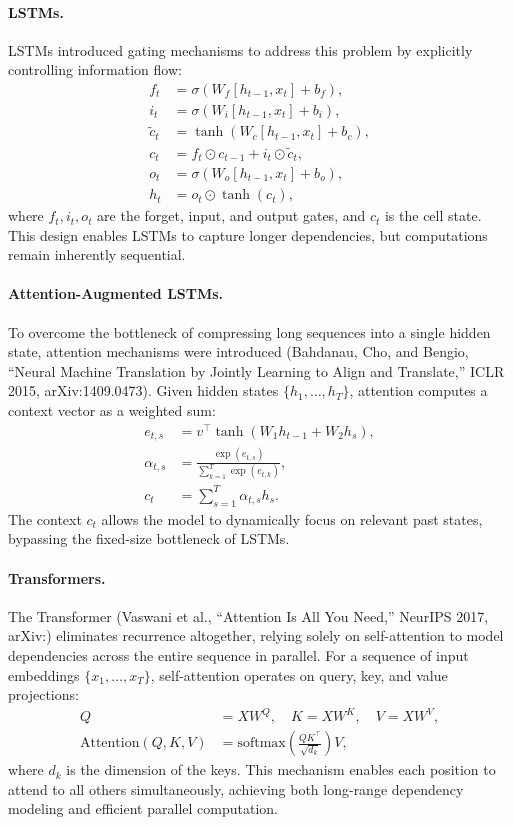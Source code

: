 \documentclass[11pt]{article}
\theoremstyle{remark}
\newcommand{\arxiv}[1]{arXiv:\allowbreak #1}
\begin{document}
\paragraph{LSTMs.}
LSTMs introduced gating mechanisms to address this problem by explicitly controlling information flow:
\begin{align}
    f_t &= \sigma(W_f [h_{t-1}, x_t] + b_f), \\
    i_t &= \sigma(W_i [h_{t-1}, x_t] + b_i), \\
    \tilde{c}_t &= \tanh(W_c [h_{t-1}, x_t] + b_c), \\
    c_t &= f_t \odot c_{t-1} + i_t \odot \tilde{c}_t, \\
    o_t &= \sigma(W_o [h_{t-1}, x_t] + b_o), \\
    h_t &= o_t \odot \tanh(c_t),
\end{align}
where $f_t, i_t, o_t$ are the forget, input, and output gates, and $c_t$ is the cell state.
This design enables LSTMs to capture longer dependencies, but computations remain inherently sequential.

\paragraph{Attention-Augmented LSTMs.}
To overcome the bottleneck of compressing long sequences into a single hidden state, attention mechanisms were introduced (Bahdanau, Cho, and Bengio, ``Neural Machine Translation by Jointly Learning to Align and Translate,'' ICLR 2015, arXiv:1409.0473).
Given hidden states $\{h_1, \ldots, h_T\}$, attention computes a context vector as a weighted sum:
\begin{align}
    e_{t,s} &= v^\top \tanh(W_1 h_{t-1} + W_2 h_s), \\
    \alpha_{t,s} &= \frac{\exp(e_{t,s})}{\sum_{k=1}^T \exp(e_{t,k})}, \\
    c_t &= \sum_{s=1}^T \alpha_{t,s} h_s.
\end{align}
The context $c_t$ allows the model to dynamically focus on relevant past states, bypassing the fixed-size bottleneck of LSTMs.

\paragraph{Transformers.}
The Transformer (Vaswani et al., ``Attention Is All You Need,'' NeurIPS 2017, \arxiv{1706.03762}) eliminates recurrence altogether, relying solely on self-attention to model dependencies across the entire sequence in parallel.
For a sequence of input embeddings $\{x_1, \ldots, x_T\}$, self-attention operates on query, key, and value projections:
\begin{align}
    Q &= X W^Q, \quad K = X W^K, \quad V = X W^V, \\
    \text{Attention}(Q,K,V) &= \mathrm{softmax}\!\left(\frac{QK^\top}{\sqrt{d_k}}\right)V,
\end{align}
where $d_k$ is the dimension of the keys.
This mechanism enables each position to attend to all others simultaneously, achieving both long-range dependency modeling and efficient parallel computation.
\end{document}
